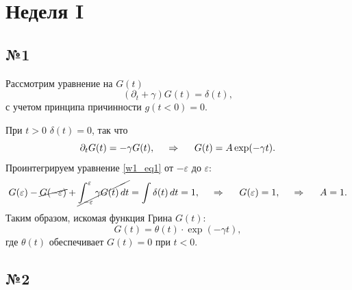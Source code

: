 \section{Неделя I}

\subsection*{№1}

Рассмотрим уравнение на $G(t)$
\begin{equation}
    (\partial_t + \gamma) G(t) = \delta(t),
    \label{w1_eq1}
\end{equation}
с учетом принципа причинности $g(t<0) = 0$. 

При $t > 0$ $\delta(t) = 0$,  так что
\begin{equation*}
    \partial_t G(t) = - \gamma G(t),
    \hspace{0.5cm} \Rightarrow \hspace{0.5cm}
    G(t) = A \exp(- \gamma t).
\end{equation*}
Проинтегрируем уравнение \eqref{w1_eq1} от $-\varepsilon$ до $\varepsilon$:
\begin{equation*}
    G(\varepsilon) - \cancel{G(-\varepsilon)} + \cancel{\int_{-\varepsilon}^{\varepsilon} \gamma G(t) \, d t } = \int \delta(t) \, d t = 1,
    \hspace{0.5cm} \Rightarrow \hspace{0.5cm}
    G(\varepsilon) = 1, 
    \hspace{0.5cm} \Rightarrow \hspace{0.5cm}
    A = 1.
\end{equation*}
Таким образом, искомая функция Грина $G(t)$:
\begin{equation*}
    G(t) = \theta(t) \cdot \exp\left(- \gamma t\right),
\end{equation*}
где $\theta(t)$ обеспечивает $G(t) = 0$ при $t<0$.




\subsection*{№2}


